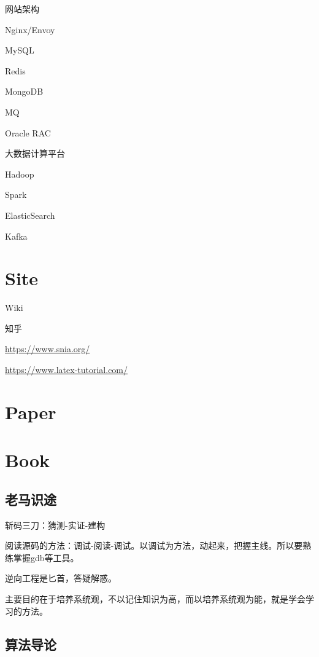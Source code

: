 网站架构
\begin{enumbox}
\item Nginx/Envoy
\item MySQL
\item Redis
\item MongoDB
\item MQ
\item Oracle RAC
\end{enumbox}

大数据计算平台
\begin{enumbox}
\item Hadoop
\item Spark
\item ElasticSearch
\item Kafka
\end{enumbox}

\section{Site}

\begin{enumbox}
\item Wiki
\item 知乎
\item \url{https://www.snia.org/}
\item \url{https://www.latex-tutorial.com/}
\end{enumbox}

\section{Paper}

\section{Book}

\subsection{老马识途}

斩码三刀：猜测-实证-建构

阅读源码的方法：调试-阅读-调试。以调试为方法，动起来，把握主线。所以要熟练掌握gdb等工具。

逆向工程是匕首，答疑解惑。

主要目的在于培养系统观，不以记住知识为高，而以培养系统观为能，就是学会学习的方法。

\subsection{算法导论}

